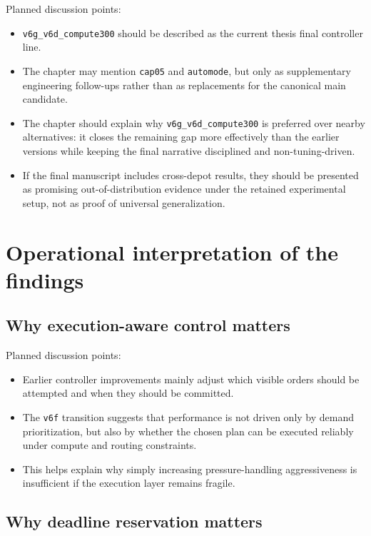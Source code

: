Planned discussion points:
\begin{itemize}
    \item \texttt{v6g\_v6d\_compute300} should be described as the current thesis final controller line.
    \item The chapter may mention \texttt{cap05} and \texttt{automode}, but only as supplementary engineering follow-ups rather than as replacements for the canonical main candidate.
    \item The chapter should explain why \texttt{v6g\_v6d\_compute300} is preferred over nearby alternatives: it closes the remaining gap more effectively than the earlier versions while keeping the final narrative disciplined and non-tuning-driven.
    \item If the final manuscript includes cross-depot results, they should be presented as promising out-of-distribution evidence under the retained experimental setup, not as proof of universal generalization.
\end{itemize}

\section{Operational interpretation of the findings}

\subsection{Why execution-aware control matters}

Planned discussion points:
\begin{itemize}
    \item Earlier controller improvements mainly adjust which visible orders should be attempted and when they should be committed.
    \item The \texttt{v6f} transition suggests that performance is not driven only by demand prioritization, but also by whether the chosen plan can be executed reliably under compute and routing constraints.
    \item This helps explain why simply increasing pressure-handling aggressiveness is insufficient if the execution layer remains fragile.
\end{itemize}

\subsection{Why deadline reservation matters}

